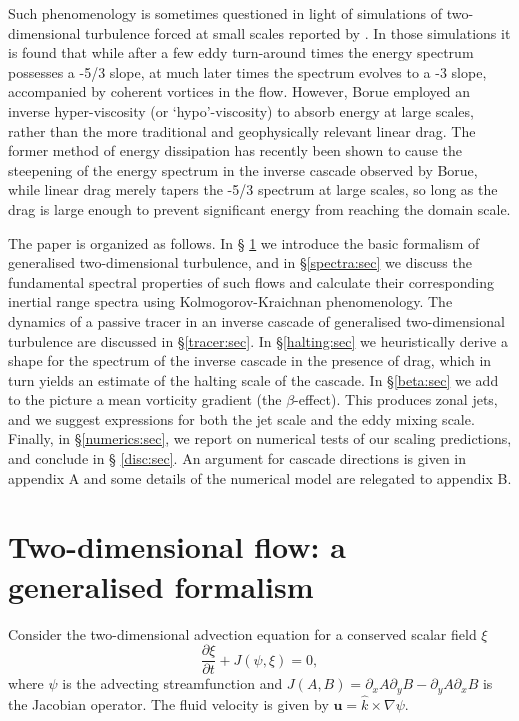 \documentclass{jfm}
\newcommand{\p}   {\partial}
\newcommand{\pp}  [2]{\frac{\p #1}{\p #2}}
\begin{document}
Such phenomenology is sometimes questioned in light of simulations of
two-dimensional turbulence forced at small scales reported by
\citet{borue94}.  In those simulations it is found that while after a
few eddy turn-around times the energy spectrum possesses a -5/3 slope,
at much later times the spectrum evolves to a -3 slope, accompanied by
coherent vortices in the flow.  However, Borue employed an inverse
hyper-viscosity (or `hypo'-viscosity) to absorb energy at large
scales, rather than the more traditional and geophysically relevant
linear drag.  The former method of energy dissipation has recently
been shown \citep{danilov01a} to cause the steepening of the energy
spectrum in the inverse cascade observed by Borue, while linear drag
merely tapers the -5/3 spectrum at large scales, so long as the drag
is large enough to prevent significant energy from reaching the domain
scale.

The paper is organized as follows. In \S \mbox{} \ref{gen2d:sec} we introduce
the basic formalism of generalised two-dimensional turbulence, and in
\S \ref{spectra:sec} we discuss the fundamental spectral properties of
such flows and calculate their corresponding inertial range spectra
using Kolmogorov-Kraichnan phenomenology.  The dynamics of a passive
tracer in an inverse cascade of generalised two-dimensional turbulence
are discussed in \S \ref{tracer:sec}.  In \S \ref{halting:sec} we
heuristically derive a shape for the spectrum of the inverse cascade
in the presence of drag, which in turn yields an estimate of the
halting scale of the cascade. In \S \ref{beta:sec} we add to the
picture a mean vorticity gradient (the $\beta$-effect). This produces
zonal jets, and we suggest expressions for both the jet scale and the
eddy mixing scale. Finally, in \S \ref{numerics:sec}, we report on
numerical tests of our scaling predictions, and conclude in \S
\ref{disc:sec}.  An argument for cascade directions is given in
appendix A and some details of the numerical model are relegated to
appendix B.

\section{Two-dimensional flow: a generalised formalism}
\label{gen2d:sec}

Consider the two-dimensional advection equation for a conserved scalar
field $\xi$
\begin{equation}
\pp{\xi}{t} + J(\psi,\xi) = 0,
\label{gen2d:eq}
\end{equation}
where $\psi$ is the advecting streamfunction and $J(A,B) = \p_x A\p_y
B - \p_y A\p_x B$ is the Jacobian operator. The fluid velocity is
given by $\boldsymbol{u} = \hat{k}\times\nabla\psi$.
\end{document}
